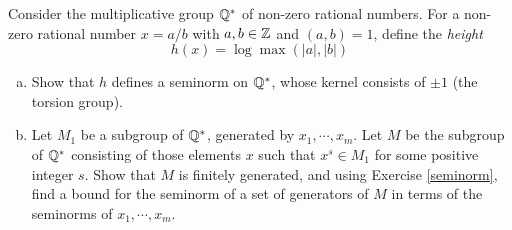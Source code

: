   \begin{ex}
    Consider the multiplicative group ${\mathbb Q}^{\ast}$ of non-zero rational numbers. For a non-zero rational number $x=a/b$ with $a,b\in{\mathbb Z}$ and $(a,b)=1$, define the \emph{height}
    \begin{equation*}
      h(x)=\log\max(|a|,|b|)
    \end{equation*}
    \begin{enumerate}[a)]
      \item Show that $h$ defines a seminorm on ${\mathbb Q}^{\ast}$, whose kernel consists of $\pm1$ (the torsion group).
      \item Let $M_1$ be a subgroup of ${\mathbb Q}^{\ast}$, generated by $x_1,\cdots,x_m$. Let $M$ be the subgroup of ${\mathbb Q}^{\ast}$ consisting of those elements $x$ such that $x^s\in M_1$ for some positive integer $s$. Show that $M$ is finitely generated, and using Exercise \ref{seminorm}, find a bound for the seminorm of a set of generators of $M$ in terms of the seminorms of $x_1,\cdots,x_m$.
    \end{enumerate}
  \end{ex}
